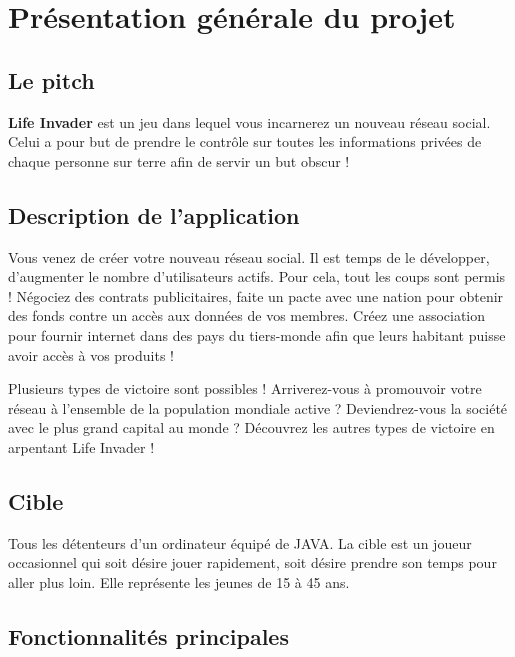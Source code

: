 \chapter{Présentation générale du projet}
\label{chap:premierchapitre}

\section{Le pitch}
\textbf{Life Invader} est un jeu dans lequel vous incarnerez un nouveau réseau social. Celui a pour but de prendre le contrôle sur toutes les informations privées de chaque personne sur terre afin de servir un but obscur !

\section{Description de l'application}

Vous venez de créer votre nouveau réseau social. Il est temps de le développer, d'augmenter le nombre d'utilisateurs actifs. Pour cela, tout les coups sont permis ! Négociez des contrats publicitaires, faite un pacte avec une nation pour obtenir des fonds contre un accès aux données de vos membres. Créez une association pour fournir internet dans des pays du tiers-monde afin que leurs habitant puisse avoir accès à vos produits !

Plusieurs types de victoire sont possibles ! Arriverez-vous à promouvoir votre réseau à l'ensemble de la population mondiale active ? Deviendrez-vous la société avec le plus grand capital au monde ? Découvrez les autres types de victoire en arpentant Life Invader !

\section{Cible}

Tous les détenteurs d'un ordinateur équipé de JAVA. La cible est un joueur occasionnel qui soit désire jouer rapidement, soit désire prendre son temps pour aller plus loin. Elle représente les jeunes de 15 à 45 ans.

\section{Fonctionnalités principales}

